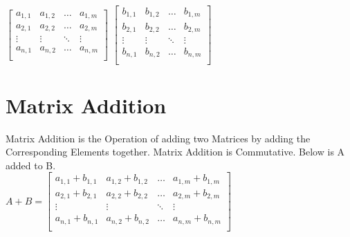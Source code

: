 \begin{flushleft}
                $
                \begin{bmatrix}
                    a_{1,1} & a_{1,2} & \hdots  & a_{1,m} \\
                    a_{2,1} & a_{2,2} & \hdots  & a_{2,m} \\
                    \vdots  & \vdots  & \ddots  & \vdots  \\
                    a_{n,1} & a_{n,2} & \hdots  & a_{n,m} \\
                \end{bmatrix}
                $
                \vspace{0.2cm}
                $
                \begin{bmatrix}
                    b_{1,1} & b_{1,2} & \hdots  & b_{1,m} \\
                    b_{2,1} & b_{2,2} & \hdots  & b_{2,m} \\
                    \vdots  & \vdots  & \ddots  & \vdots  \\
                    b_{n,1} & b_{n,2} & \hdots  & b_{n,m} \\
                \end{bmatrix}
                $

                \chapter{Matrix Addition}
                    \vspace{0.2cm}
                    Matrix Addition is the Operation of adding two Matrices by adding the Corresponding Elements together. Matrix Addition is Commutative. 
                    Below is A added to B. \\
                    $
                    A + B =
                    \begin{bmatrix}
                        a_{1,1} + b_{1,1} & a_{1,2} + b_{1,2} & \hdots  & a_{1,m} + b_{1,m} \\
                        a_{2,1} + b_{2,1} & a_{2,2} + b_{2,2} & \hdots  & a_{2,m} + b_{2,m} \\
                        \vdots            & \vdots            & \ddots  & \vdots            \\
                        a_{n,1} + b_{n,1} & a_{n,2} + b_{n,2} & \hdots  & a_{n,m} + b_{n,m} \\
                    \end{bmatrix}
                    $


\end{flushleft}
